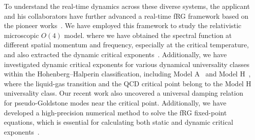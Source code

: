 \documentclass[letterpaper,11pt]{article}
\begin{document}
To understand the real-time dynamics across these diverse systems, the applicant and his collaborators have further advanced a real-time fRG framework based on the pioneer works~\cite{Berges:2008sr,Berges:2012ty}. We have employed this framework to study the relativistic microscopic $O(4)$ model. where we have obtained the spectral function at different spatial momentum and frequency, especially at the critical temperature, and also extracted the dynamic critical exponents~\cite{Tan:2021zid}. Additionally, we have investigated dynamic critical exponents for various dynamical universality classes within the Hohenberg–Halperin classification, including Model A~\cite{Chen:2023tqc} and Model H~\cite{Chen:2024lzz}, where the liquid-gas transition and the QCD critical point belong to the Model H universality class. Our recent work also uncovered a universal damping relation for pseudo-Goldstone modes near the critical point\cite{Tan:2024fuq}. Additionally,  we have developed a high-precision numerical method to solve the fRG fixed-point equations, which is essential for calculating both static and dynamic critical exponents~\cite{Tan:2022ksv}.
\end{document}
